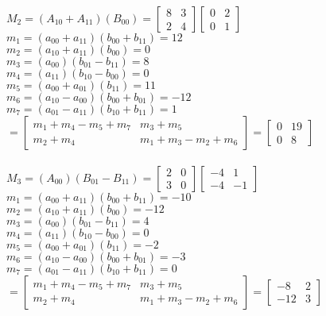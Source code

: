 \documentclass[letterpaper,10pt]{article}
\begin{document}
\begin{flushleft}
$M_2=(A_{10}+A_{11})(B_{00})=
\left[ 
	\begin{array}{cc}
		8 & 3\\
		2 & 4 
	\end{array} 
\right]
\left[ 
	\begin{array}{cc}
		0 & 2\\
		0 & 1 
	\end{array} 
\right]$\\
	$m_1=(a_{00}+a_{11})(b_{00}+b_{11})=12$\\
	$m_2=(a_{10}+a_{11})(b_{00})=0$\\
	$m_3=(a_{00})(b_{01}-b_{11})=8$\\
	$m_4=(a_{11})(b_{10}-b_{00})=0$\\
	$m_5=(a_{00}+a_{01})(b_{11})=11$\\
	$m_6=(a_{10}-a_{00})(b_{00}+b_{01})=-12$\\
	$m_7=(a_{01}-a_{11})(b_{10}+b_{11})=1$\\
$=
\left[ 
	\begin{array}{cc}
		m_1+m_4-m_5+m_7 & m_3+m_5\\
		m_2+m_4 & m_1+m_3-m_2+m_6 
	\end{array} 
\right]	=
	\left[ 
		\begin{array}{cc}
			0 & 19\\
			0 & 8 
		\end{array} 
	\right]$\\
~\\

$M_3=(A_{00})(B_{01}-B_{11})=
\left[ 
	\begin{array}{cc}
		2 & 0\\
		3 & 0 
	\end{array} 
\right]
\left[ 
	\begin{array}{cc}
		-4 & 1\\
		-4 & -1 
	\end{array} 
\right]$\\
	$m_1=(a_{00}+a_{11})(b_{00}+b_{11})=-10$\\
	$m_2=(a_{10}+a_{11})(b_{00})=-12$\\
	$m_3=(a_{00})(b_{01}-b_{11})=4$\\
	$m_4=(a_{11})(b_{10}-b_{00})=0$\\
	$m_5=(a_{00}+a_{01})(b_{11})=-2$\\
	$m_6=(a_{10}-a_{00})(b_{00}+b_{01})=-3$\\
	$m_7=(a_{01}-a_{11})(b_{10}+b_{11})=0$\\
$=
\left[ 
	\begin{array}{cc}
		m_1+m_4-m_5+m_7 & m_3+m_5\\
		m_2+m_4 & m_1+m_3-m_2+m_6 
	\end{array} 
\right]	=
	\left[ 
		\begin{array}{cc}
			-8 & 2\\
			-12 & 3 
		\end{array} 
	\right]$\\
~\\


\end{flushleft}
\end{document}
